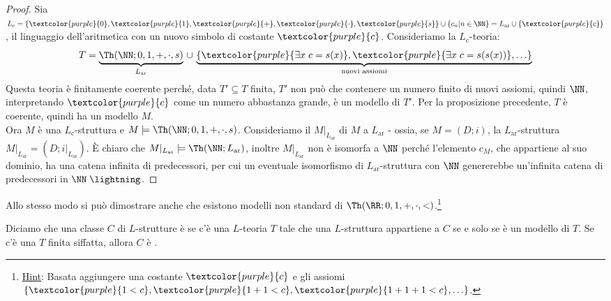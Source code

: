 \begin{proof}
    Sia $L_{\text{c}} = \{\textcolor{purple}{0}, \textcolor{purple}{1}, \textcolor{purple}{+}, \textcolor{purple}{\cdot}, \textcolor{purple}{s}\} \cup \{c_n | n \in \NN\} = L_{\text{ar}} \cup \{\textcolor{purple}{c}\}$, il linguaggio dell'aritmetica 
    con un nuovo simbolo di costante $\textcolor{purple}{c}$. Consideriamo la $L_{\text{c}}$-teoria:
    \[ T = \underbrace{\Th(\NN;0,1,+,\cdot,s)}_{L_\text{ar}} \,\cup\, \underbrace{\{\textcolor{purple}{\exists x \; c = s(x)}, \textcolor{purple}{\exists x \; c = s(s(x))}, \ldots\}}_{\text{nuovi assiomi}}
    \]
    Questa teoria è finitamente coerente perché, data $T' \subseteq T$ finita, $T'$ non può che contenere un numero finito di nuovi assiomi, quindi $\NN$, interpretando $\textcolor{purple}{c}$ come un numero abbastanza grande, è un modello di $T'$. Per la proposizione precedente, $T$ è coerente, quindi ha un modello $M$.\\
    Ora $M$ è una $L_{\text{c}}$-struttura e $M \models \Th(\NN;0,1,+,\cdot,s)$. Consideriamo il  $M|_{L_{\text{ar}}}$ di $M$ a $L_{\text{ar}}$ - ossia, se $M = (D;i)$, la $L_{\text{ar}}$-struttura $M|_{L_{\text{ar}}} = (D;i|_{L_{\text{ar}}})$. È chiaro che $M|_{L_{\text{ar}}} \models \Th(\NN;L_{\text{ar}})$,
    inoltre $M|_{L_{\text{ar}}}$ non è isomorfa a $\NN$ perché l'elemento $c_M$, che appartiene al suo dominio, ha una catena infinita di predecessori, per cui un eventuale isomorfismo di $L_{\text{ar}}$-struttura con $\NN$ genererebbe un'infinita catena di predecessori in $\NN \; \lightning$.
\end{proof}

\begin{exercise}
    Allo stesso modo si può dimostrare anche che esistono modelli non standard di $\Th(\RR; 0,1,+,\cdot,<)$.\footnote{\underline{Hint}: Basata aggiungere una costante $\textcolor{purple}{c}$ e gli assiomi $\{\textcolor{purple}{1 < c}, \textcolor{purple}{1 + 1 < c}, \textcolor{purple}{1 + 1 + 1 < c}, \ldots\}$.}
\end{exercise}

\begin{definition}
    Diciamo che una classe $C$ di $L$-strutture è  se c'è una $L$-teoria $T$ tale che
    una $L$-struttura appartiene a $C$ se e solo se è un modello di $T$. Se c'è una $T$ finita siffatta, allora $C$ è .
\end{definition}

